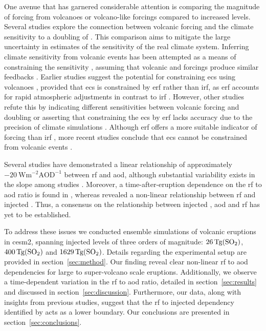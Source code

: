 \documentclass{ametsocV6.1}
\newcommand{\iso}[1][i]{{#1}njected \ce{SO2}}
\begin{document}
One avenue that has garnered considerable attention is comparing the magnitude of
forcing from volcanoes or volcano-like forcings compared to increased  levels.
Several studies explore the connection between volcanic forcing and the climate
sensitivity to a doubling of 
\citep{boer2007,marvel2016,merlis2014,ollila2016,richardson2019,salvi2022,wigley2005}.
This comparison aims to mitigate the large uncertainty in estimates of the sensitivity
of the real climate system. Inferring climate sensitivity from volcanic events has been
attempted as a means of constraining the sensitivity \citep{boer2007}, assuming that
volcanic and  forcings produce similar feedbacks \citep{pauling2023}. Earlier
studies suggest the potential for constraining \gls{ecs} using volcanoes
\citep{bender2010}, provided that \gls{ecs} is constrained by \gls{erf} rather than
\gls{irf}, as \gls{erf} accounts for rapid atmospheric adjustments in contrast to
\gls{irf} \citep{richardson2019}. However, other studies refute this by indicating
different sensitivities between volcanic forcing and  doubling
\citep{douglass2006} or asserting that constraining the \gls{ecs} by \gls{erf} lacks
accuracy due to the precision of climate simulations \citep{boer2007,salvi2022}.
Although \gls{erf} offers a more suitable indicator of forcing than \gls{irf}
\citep{marvel2016,richardson2019}, more recent studies conclude that \gls{ecs} cannot be
constrained from volcanic events \citep{pauling2023}.

Several studies have demonstrated a linear relationship of approximately
\(-\SI{20}{\watt\metre^{-2}\mathrm{AOD}^{-1}}\) between \gls{rf} and \gls{aod}, although
substantial variability exists in the slope among studies
\citep{mills2017,hansen2005,gregory2016,marshall2020,pitari2016b}. Moreover, a
time-after-eruption dependence on the \gls{rf} to \gls{aod} ratio is found in
\citet{marshall2020}, whereas \citet{niemeier2015} revealed a non-linear relationship
between \gls{rf} and \iso{}. Thus, a consensus on the relationship between \iso{},
\gls{aod} and \gls{rf} has yet to be established.

To address these issues we conducted ensemble simulations of volcanic eruptions in
\gls{cesm2}, spanning \iso{} levels of three orders of magnitude:
\(\SI{26}{\tera\gram(\ce{SO2})}\), \(\SI{400}{\tera\gram(\ce{SO2})}\) and
\(\SI{1629}{\tera\gram(\ce{SO2})}\). Details regarding the experimental setup are
provided in section~\ref{sec:method}. Our finding reveal clear non-linear \gls{rf} to
\gls{aod} dependencies for large to super-volcano scale eruptions. Additionally, we
observe a time-dependent variation in the \gls{rf} to \gls{aod} ratio, detailed in
section~\ref{sec:results} and discussed in section~\ref{sec:discussion}. Furthermore,
our data, along with insights from previous studies, suggest that the \gls{rf} to \iso{}
dependency identified by \citet{niemeier2015} acts as a lower boundary. Our conclusions
are presented in section~\ref{sec:conclusions}.
\end{document}
